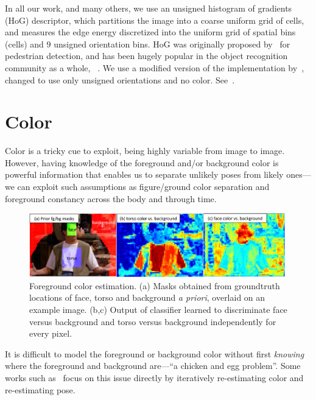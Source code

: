 In all our work, and many others, we use an unsigned histogram of gradients 
(HoG) descriptor, which partitions the image into a coarse uniform grid of 
cells, and measures the edge energy discretized into the uniform grid of 
spatial bins (cells) and $9$ unsigned orientation bins.  HoG was originally 
proposed by~\citet{dalal-triggs} for pedestrian detection, and has been hugely 
popular in the object recognition community as a whole, \eg~\cite{pff-dpm}.  We use a modified version of the implementation 
by~\citet{pff-dpm}, changed to use only unsigned orientations and no color.  
See~.

\section{Color}\label{sec:color}
Color is a tricky cue to exploit, being highly variable from image to image.  
However, having knowledge of the foreground and/or background color is powerful 
information that enables us to separate unlikely poses from likely ones---we 
can exploit such assumptions as figure/ground color separation and foreground 
constancy across the body and through time. 

\begin{figure}[tb]
\begin{center}
\includegraphics[width=0.99\textwidth]{figs/fg-color.pdf}
\caption[Foreground color estimation.]{Foreground color estimation.  (a) Masks 
obtained from groundtruth locations of face, torso and background {\em a 
priori}, overlaid on an example image. (b,c) Output of classifier learned to 
discriminate face versus background and torso versus background independently 
for every pixel. }
\label{fig:fg-color}
\end{center}
\end{figure}



It is difficult to model the foreground or background color without first {\em 
knowing} where the foreground and background are---``a chicken and egg 
problem''.  Some works such as~\citet{devacrf,eichner09} focus on this issue 
directly by iteratively re-estimating color and re-estimating pose.  

